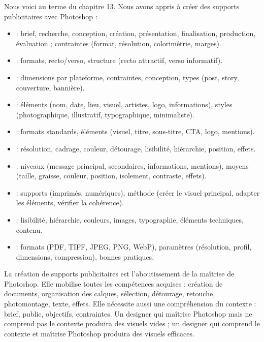 Nous voici au terme du chapitre 13. Nous avons appris à créer des supports publicitaires avec Photoshop :

\begin{itemize}
    \item {} : brief, recherche, conception, création, présentation, finalisation, production, évaluation ; contraintes (format, résolution, colorimétrie, marges).
    \item {} : formats, recto/verso, structure (recto attractif, verso informatif).
    \item {} : dimensions par plateforme, contraintes, conception, types (post, story, couverture, bannière).
    \item {} : éléments (nom, date, lieu, visuel, artistes, logo, informations), styles (photographique, illustratif, typographique, minimaliste).
    \item {} : formats standards, éléments (visuel, titre, sous-titre, CTA, logo, mentions).
    \item {} : résolution, cadrage, couleur, détourage, lisibilité, hiérarchie, position, effets.
    \item {} : niveaux (message principal, secondaires, informations, mentions), moyens (taille, graisse, couleur, position, isolement, contraste, effets).
    \item {} : supports (imprimés, numériques), méthode (créer le visuel principal, adapter les éléments, vérifier la cohérence).
    \item {} : lisibilité, hiérarchie, couleurs, images, typographie, éléments techniques, contenu.
    \item {} : formats (PDF, TIFF, JPEG, PNG, WebP), paramètres (résolution, profil, dimensions, compression), bonnes pratiques.
\end{itemize}

La création de supports publicitaires est l'aboutissement de la maîtrise de Photoshop. Elle mobilise toutes les compétences acquises : création de documents, organisation des calques, sélection, détourage, retouche, photomontage, texte, effets. Elle nécessite aussi une compréhension du contexte : brief, public, objectifs, contraintes. Un designer qui maîtrise Photoshop mais ne comprend pas le contexte produira des visuels vides ; un designer qui comprend le contexte et maîtrise Photoshop produira des visuels efficaces.


